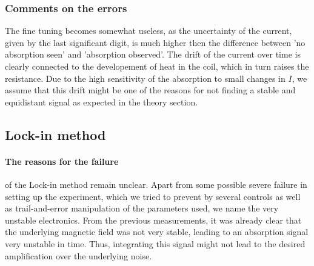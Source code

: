 \subsubsection{Comments on the errors}
The fine tuning becomes somewhat useless, as the uncertainty of the current, given by the last 
significant digit, is much higher then the difference between 'no absorption seen' and 
'absorption observed'. The drift of the current over time is clearly connected to the developement 
of heat in the coil, which in turn raises the resistance. Due to the high sensitivity of the absorption 
to small changes in $I$, we assume that this drift might be one of the reasons for not finding 
a stable and equidistant signal as expected in the theory section. 





\subsection{Lock-in method}
\paragraph{The reasons for the failure} 
of the Lock-in method remain unclear. Apart from some possible severe 
failure in setting up the experiment, which we tried to prevent by several 
controls as well as trail-and-error manipulation of the parameters used, 
we name the very unstable electronics. From the previous measurements, it was 
already clear that the underlying magnetic field was not very stable, leading 
to an absorption signal very unstable in time. Thus, integrating this signal 
might not lead to the desired amplification over the underlying noise. 

